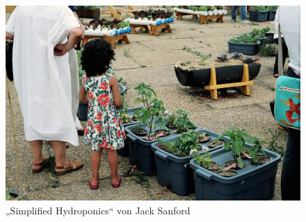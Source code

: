 \documentclass{scrartcl}
\begin{document}
\begin{figure}[htbp]
    \centering
    \includegraphics[width=14cm]{image_folder/simplified_hydroponics_jack_sanford.jpg}
  \caption{„Simplified Hydroponics“ von Jack Sanford}
  \label{fig:shydroponics}
\end{figure} 
\end{document}

